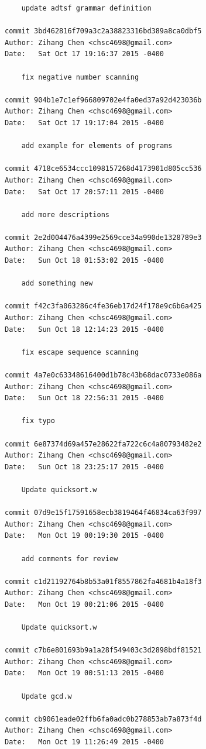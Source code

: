 \documentclass{report}
\begin{document}
\begin{appendices}
\begin{verbatim}
    update adtsf grammar definition

commit 3bd462816f709a3c2a38823316bd389a8ca0dbf5
Author: Zihang Chen <chsc4698@gmail.com>
Date:   Sat Oct 17 19:16:37 2015 -0400

    fix negative number scanning

commit 904b1e7c1ef966809702e4fa0ed37a92d423036b
Author: Zihang Chen <chsc4698@gmail.com>
Date:   Sat Oct 17 19:17:04 2015 -0400

    add example for elements of programs

commit 4718ce6534ccc1098157268d4173901d805cc536
Author: Zihang Chen <chsc4698@gmail.com>
Date:   Sat Oct 17 20:57:11 2015 -0400

    add more descriptions

commit 2e2d004476a4399e2569cce34a990de1328789e3
Author: Zihang Chen <chsc4698@gmail.com>
Date:   Sun Oct 18 01:53:02 2015 -0400

    add something new

commit f42c3fa063286c4fe36eb17d24f178e9c6b6a425
Author: Zihang Chen <chsc4698@gmail.com>
Date:   Sun Oct 18 12:14:23 2015 -0400

    fix escape sequence scanning

commit 4a7e0c63348616400d1b78c43b68dac0733e086a
Author: Zihang Chen <chsc4698@gmail.com>
Date:   Sun Oct 18 22:56:31 2015 -0400

    fix typo

commit 6e87374d69a457e28622fa722c6c4a80793482e2
Author: Zihang Chen <chsc4698@gmail.com>
Date:   Sun Oct 18 23:25:17 2015 -0400

    Update quicksort.w

commit 07d9e15f17591658ecb3819464f46834ca63f997
Author: Zihang Chen <chsc4698@gmail.com>
Date:   Mon Oct 19 00:19:30 2015 -0400

    add comments for review

commit c1d21192764b8b53a01f8557862fa4681b4a18f3
Author: Zihang Chen <chsc4698@gmail.com>
Date:   Mon Oct 19 00:21:06 2015 -0400

    Update quicksort.w

commit c7b6e801693b9a1a28f549403c3d2898bdf81521
Author: Zihang Chen <chsc4698@gmail.com>
Date:   Mon Oct 19 00:51:13 2015 -0400

    Update gcd.w

commit cb9061eade02ffb6fa0adc0b278853ab7a873f4d
Author: Zihang Chen <chsc4698@gmail.com>
Date:   Mon Oct 19 11:26:49 2015 -0400


\end{verbatim}
\end{appendices}
\end{document}
